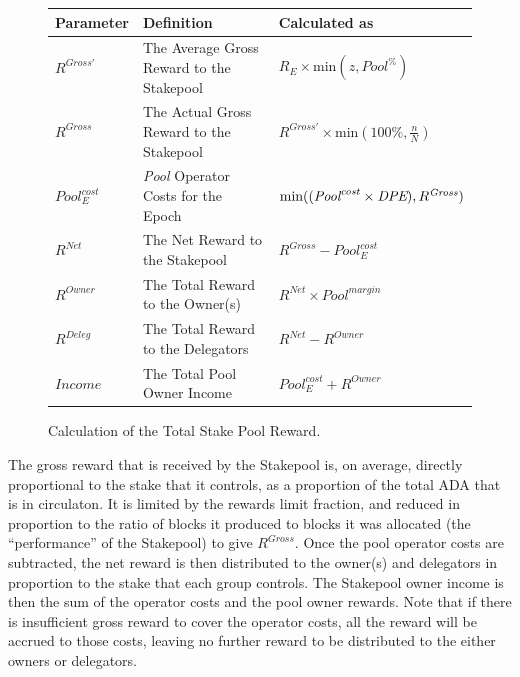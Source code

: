 \documentclass[11pt,a4paper,dvipsnames,twosided,final]{article}
\newcommand{\ada}{ADA{}}
\begin{document}
\begin{figure}[h!]
\begin{center}
\begin{tabular}{||l|p{6cm}|l||}
  \hline \hline
\textbf{Parameter}  & \textbf{Definition} & \textbf{Calculated as} \\\hline
$R^{Gross'}$ & The Average Gross Reward to the Stakepool & $R_E \times \textrm{min} (z,{\textit{Pool}}^\%)$ \\\hline
$R^{\textit{Gross}}$ & The Actual Gross Reward to the Stakepool & $R^{Gross'} \times \textrm{min} (100\%,\frac{n}{N})$ \\\hline
${\textit{Pool}}^{\textit{cost}}_E$ & \textit{Pool} Operator Costs for the Epoch & $\textrm{min}((\textit{\textit{Pool}}^{\textit{cost}} \times \textit{DPE}),R^{\textit{Gross}})$ \\\hline
$R^{\textit{Net}}$  & The Net Reward to the Stakepool & $R^{\textit{Gross}} - {\textit{Pool}}^{\textit{cost}}_E$ \\\hline
$R^{Owner}$ & The Total Reward to the Owner(s) & $R^{\textit{Net}} \times {\textit{Pool}}^{\textit{margin}} $ \\\hline
$R^{Deleg}$ & The Total Reward to the Delegators & $R^{\textit{Net}} - R^{Owner}$ \\\hline
$\textit{Income}$ & The Total Pool Owner Income & ${\textit{Pool}}^{\textit{cost}}_E + R^{Owner}$ \\\hline
\hline
\end{tabular}
\end{center}
\caption{Calculation of the Total Stake Pool Reward.}
\end{figure}

\noindent
The gross reward that is received by the Stakepool is, on average, directly proportional to the
stake that it controls, as a proportion of the total \ada{} that is in circulaton.
It is limited by the rewards limit fraction, and reduced in proportion to the ratio of blocks it produced
to blocks it was allocated (the ``performance'' of the Stakepool) to give $R^{\textit{Gross}}$.
Once the pool operator costs are subtracted,
the net reward is then distributed to the owner(s) and delegators in proportion to the
stake that each group controls.  The Stakepool owner income is then the sum of the operator costs and the pool owner rewards.
Note that if there is insufficient gross reward to cover the operator costs, all the reward will be accrued to those
costs, leaving no further reward to be distributed to the either owners or delegators.
\end{document}
